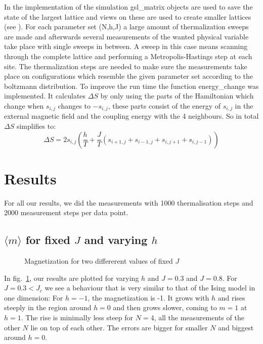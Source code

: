 \documentclass{scrartcl}
\begin{document}
In the implementation of the simulation gsl\_matrix objects are used to save the state of the largest lattice and views on these are used to create smaller lattices (see \cite{gsldoc_mat}). For each parameter set (N,h,J) a large amount of thermalization sweeps are made and afterwards several measurements of the wanted physical variable take place with single sweeps in between. A sweep in this case means scanning through the complete lattice and performing a Metropolis-Hastings step at each site. The thermalization steps are needed to make sure the measurements take place on configurations which resemble the given parameter set according to the boltzmann distribution. To improve the run time the function energy\_change was implemented. It calculates $\Delta S$ by only using the parts of the Hamiltonian which change when $s_{i,j}$ changes to $-s_{i,j}$, these parts consist of the energy of $s_{i,j}$ in the external magnetic field and the coupling energy with the 4 neighbours.
So in total $\Delta S$ simplifies to:
\begin{equation}
	\Delta S=2 s_{i,j}\left(\dfrac{h}{T}+\dfrac{J}{T}(s_{i+1,j}+s_{i-1,j}+s_{i,j+1}+s_{i,j-1})\right)
\end{equation}


\section{Results}

For all our results, we did the measurements with 1000 thermalisation steps and 2000 measurement steps per data point.

\subsection{$\langle m\rangle$ for fixed $J$ and varying $h$}

\begin{figure}[htbp]
	
	\caption{Magnetization for two differerent values of fixed $J$}
	\label{fig:magfixJ}
\end{figure}

In fig.~\ref{fig:magfixJ}, our results are plotted for varying $h$ and $J=0.3$ and $J=0.8$. For $J=0.3<J_c$ we see a behaviour that is very similar to that of the Ising model in one dimension: For $h=-1$, the magnetization is -1. It grows with $h$ and rises steeply in the region around $h=0$ and then grows slower, coming to $m=1$ at $h=1$. The rise is minimally less steep for $N=4$, all the measurements of the other $N$ lie on top of each other. The errors are bigger for smaller $N$ and biggest around $h=0$.
 
\end{document}
